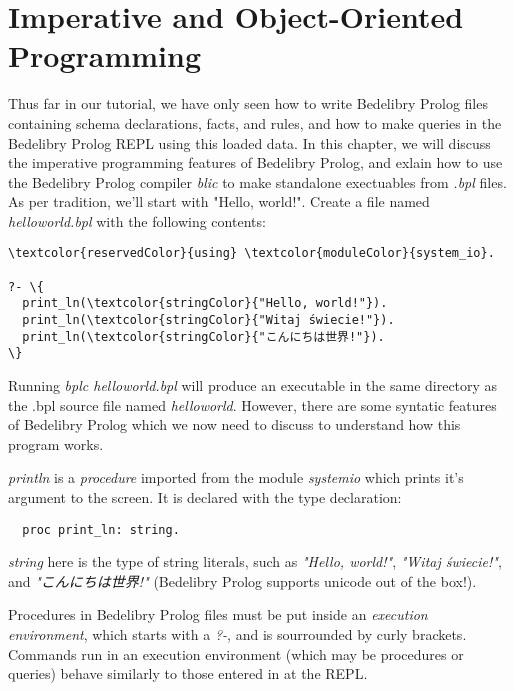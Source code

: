 \documentclass{book}
\begin{document}
\chapter{Imperative and Object-Oriented Programming}

Thus far in our tutorial, we have only seen how to write Bedelibry Prolog files containing schema declarations, facts, and rules, and how to make queries in the Bedelibry Prolog REPL using this loaded data. In this chapter, we will discuss the imperative programming features of Bedelibry Prolog, and exlain how to use the Bedelibry Prolog compiler \textit{blic} to make standalone exectuables from \textit{.bpl} files. As per tradition, we'll start with "Hello, world!". Create a file named \textit{hello\textunderscore world.bpl} with the following contents:

\begin{Verbatim}[commandchars=\\\{\}]
\textcolor{reservedColor}{using} \textcolor{moduleColor}{system_io}.

?- \{
  print_ln(\textcolor{stringColor}{"Hello, world!"}).
  print_ln(\textcolor{stringColor}{"Witaj świecie!"}).
  print_ln(\textcolor{stringColor}{"こんにちは世界!"}).
\}
\end{Verbatim}

Running \textit{bplc hello\textunderscore world.bpl} will produce an executable in the same directory as the .bpl source file named \textit{hello\textunderscore world}. However, there are some syntatic features of Bedelibry Prolog which we now need to discuss to understand how this program works.

\textit{print\textunderscore ln} is a \textit{procedure} imported from the module \textit{system\textunderscore io} which prints it's argument to the screen. It is declared with the type declaration:

\begin{verbatim}
  proc print_ln: string.
\end{verbatim}

\textit{string} here is the type of string literals, such as \textit{"Hello, world!"}, \textit{"Witaj świecie!"}, and \textit{"こんにちは世界!"} (Bedelibry Prolog supports unicode out of the box!). 

Procedures in Bedelibry Prolog files must be put inside an \textit{execution environment}, which starts with a \textit{?-}, and is sourrounded by curly brackets. Commands run in an execution environment (which may be procedures or queries) behave similarly to those entered in at the REPL. 
\end{document}
